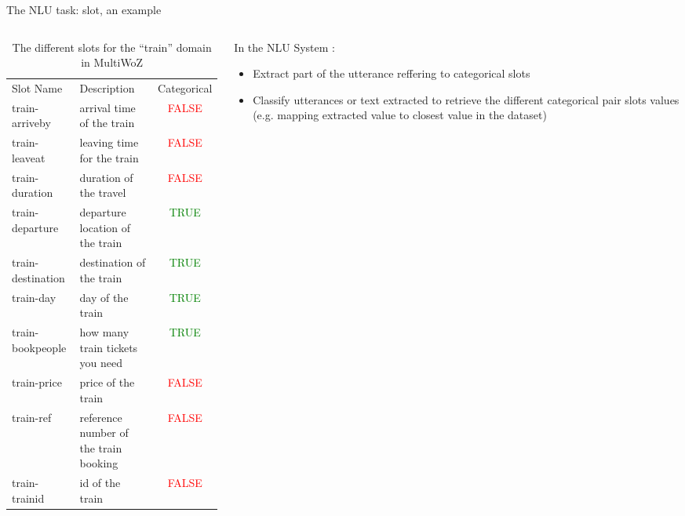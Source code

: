 \documentclass[10pt,aspectratio=169]{beamer}
\newcommand{\largehline}{\specialrule{.16em}{.3em}{.3em}}
\begin{document}
\begin{frame}{The NLU task: slot, an example}
        \begin{columns}
        \begin{column}{0.6\textwidth}
            \begin{table}[]
                \footnotesize
                \begin{tabular}{l|p{4cm}|c}
                     Slot Name & Description & Categorical\\
                     \largehline
                     train-arriveby & arrival time of the train & \textcolor{red}{FALSE}\\
                     train-leaveat & leaving time for the train & \textcolor{red}{FALSE} \\
                      train-duration & duration of the travel & \textcolor{red}{FALSE} \\
                     train-departure & departure location of the train & \textcolor{green}{TRUE} \\
                     train-destination & destination of the train & \textcolor{green}{TRUE} \\
                     train-day &  day of the train & \textcolor{green}{TRUE} \\
                     train-bookpeople & how many train tickets you need & \textcolor{green}{TRUE} \\
                     train-price & price of the train & \textcolor{red}{FALSE} \\
                     train-ref & reference number of the train booking & \textcolor{red}{FALSE}\\
                     train-trainid & id of the train & \textcolor{red}{FALSE} \\
                     

                     
                \end{tabular}
                \caption{The different slots for the ``train'' domain in MultiWoZ}
                \label{table:example_slot_train}
            \end{table}
        \end{column}
        \begin{column}{0.4\textwidth}
            \begin{block}{In the NLU System :}
                \begin{itemize}
                    \item Extract part of the utterance reffering to categorical slots
                    \item Classify utterances or text extracted to retrieve the different categorical pair slots values (e.g. mapping extracted value to closest value in the dataset)
                \end{itemize}
                
            \end{block}

        \end{column}
    \end{columns}
\end{frame}
\end{document}
